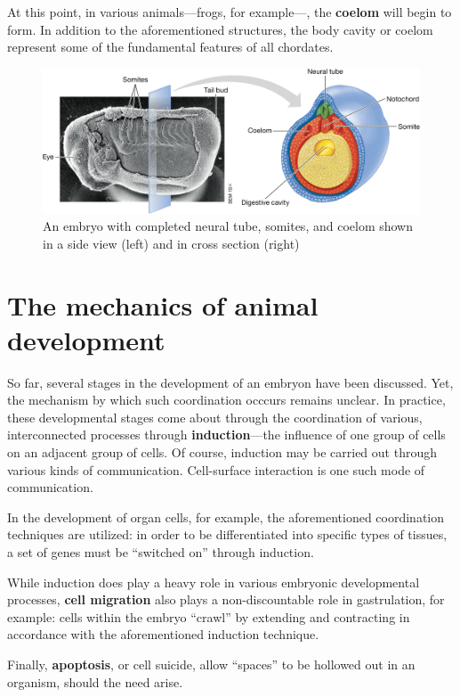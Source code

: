 \documentclass{article}
\begin{document}
At this point, in various animals---frogs, for example---, the \textbf{coelom}
will begin to form. In addition to the aforementioned structures, the body
cavity or coelom represent some of the fundamental features of all chordates.

\bigbreak

\begin{figure}[h]
	\centering
	\includegraphics[width=.8\linewidth]{embryo_cross_section_neural_tube.png}
	\caption{An embryo with completed neural tube, somites, and coelom shown in a side view (left) and in cross section (right)}
\end{figure}

\section{The mechanics of animal development}

So far, several stages in the development of an embryon have been discussed.
Yet, the mechanism by which such coordination occcurs remains unclear. In
practice, these developmental stages come about through the coordination of
various, interconnected processes through \textbf{induction}---the influence
of one group of cells on an adjacent group of cells. Of course, induction may
be carried out through various kinds of communication. Cell-surface interaction
is one such mode of communication.

In the development of organ cells, for example, the aforementioned coordination
techniques are utilized: in order to be differentiated into specific types of
tissues, a set of genes must be ``switched on'' through induction.

While induction does play a heavy role in various embryonic developmental processes,
\textbf{cell migration} also plays a non-discountable role in gastrulation, for
example: cells within the embryo ``crawl'' by extending and contracting in accordance
with the aforementioned induction technique.

Finally, \textbf{apoptosis}, or cell suicide, allow ``spaces'' to be hollowed
out in an organism, should the need arise.
\end{document}
